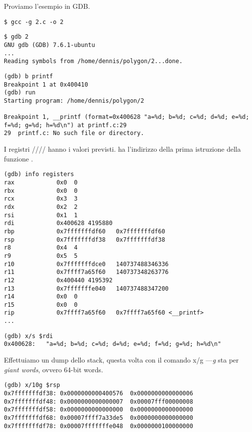 
Proviamo l'esempio in \ac{GDB}.

\begin{lstlisting}
$ gcc -g 2.c -o 2
\end{lstlisting}

\begin{lstlisting}
$ gdb 2
GNU gdb (GDB) 7.6.1-ubuntu
...
Reading symbols from /home/dennis/polygon/2...done.
\end{lstlisting}

\begin{lstlisting}[caption=impostiamo il breakpoint su \printf{,} e avviamo]
(gdb) b printf
Breakpoint 1 at 0x400410
(gdb) run
Starting program: /home/dennis/polygon/2 

Breakpoint 1, __printf (format=0x400628 "a=%d; b=%d; c=%d; d=%d; e=%d; f=%d; g=%d; h=%d\n") at printf.c:29
29	printf.c: No such file or directory.
\end{lstlisting}

I registri \RSI/\RDX/\RCX// hanno i valori previsti.
\RIP ha l'indirizzo della prima istruzione della funzione \printf.

\begin{lstlisting}
(gdb) info registers
rax            0x0	0
rbx            0x0	0
rcx            0x3	3
rdx            0x2	2
rsi            0x1	1
rdi            0x400628	4195880
rbp            0x7fffffffdf60	0x7fffffffdf60
rsp            0x7fffffffdf38	0x7fffffffdf38
r8             0x4	4
r9             0x5	5
r10            0x7fffffffdce0	140737488346336
r11            0x7ffff7a65f60	140737348263776
r12            0x400440	4195392
r13            0x7fffffffe040	140737488347200
r14            0x0	0
r15            0x0	0
rip            0x7ffff7a65f60	0x7ffff7a65f60 <__printf>
...
\end{lstlisting}

\begin{lstlisting}[caption=ispezioniamo la format string]
(gdb) x/s $rdi
0x400628:	"a=%d; b=%d; c=%d; d=%d; e=%d; f=%d; g=%d; h=%d\n"
\end{lstlisting}

Effettuiamo un dump dello stack, questa volta con il comando x/g ---\emph{g} sta per \emph{giant words}, ovvero 64-bit words.

\begin{lstlisting}
(gdb) x/10g $rsp
0x7fffffffdf38:	0x0000000000400576	0x0000000000000006
0x7fffffffdf48:	0x0000000000000007	0x00007fff00000008
0x7fffffffdf58:	0x0000000000000000	0x0000000000000000
0x7fffffffdf68:	0x00007ffff7a33de5	0x0000000000000000
0x7fffffffdf78:	0x00007fffffffe048	0x0000000100000000
\end{lstlisting}

